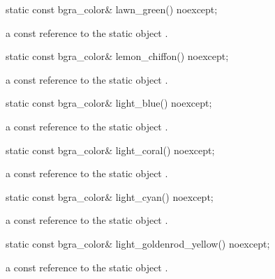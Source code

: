 \begin{itemdecl}
static const bgra_color& lawn_green() noexcept;
\end{itemdecl}
\begin{itemdescr}
\pnum
\returns
a const reference to the static  object .
\end{itemdescr}

\begin{itemdecl}
static const bgra_color& lemon_chiffon() noexcept;
\end{itemdecl}
\begin{itemdescr}
\pnum
\returns
a const reference to the static  object .
\end{itemdescr}

\begin{itemdecl}
static const bgra_color& light_blue() noexcept;
\end{itemdecl}
\begin{itemdescr}
\pnum
\returns
a const reference to the static  object .
\end{itemdescr}

\begin{itemdecl}
static const bgra_color& light_coral() noexcept;
\end{itemdecl}
\begin{itemdescr}
\pnum
\returns
a const reference to the static  object .
\end{itemdescr}

\begin{itemdecl}
static const bgra_color& light_cyan() noexcept;
\end{itemdecl}
\begin{itemdescr}
\pnum
\returns
a const reference to the static  object .
\end{itemdescr}

\begin{itemdecl}
static const bgra_color& light_goldenrod_yellow() noexcept;
\end{itemdecl}
\begin{itemdescr}
\pnum
\returns
a const reference to the static  object .
\end{itemdescr}

